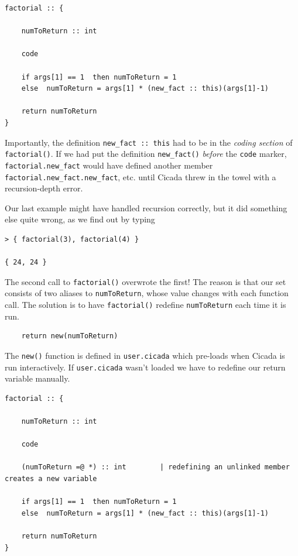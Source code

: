 \documentclass{article}
\newenvironment{code}{
       \begin{list}{}{
               \setlength{\leftmargin}{.4in}
               \setlength{\rightmargin}{0in}
               \setlength{\topsep}{.2in}
       }
       \small
       \item[] }
       { \end{list}   }
\begin{document}
\begin{code} \begin{verbatim}
factorial :: {
    
    numToReturn :: int
    
    code
    
    if args[1] == 1  then numToReturn = 1
    else  numToReturn = args[1] * (new_fact :: this)(args[1]-1)
    
    return numToReturn
}
\end{verbatim} \end{code}

\noindent Importantly, the definition \verb#new_fact :: this# had to be in the \emph{coding section} of \verb#factorial()#.  If we had put the definition \verb#new_fact()# \emph{before} the \verb#code# marker, \verb#factorial.new_fact# would have defined another member \verb#factorial.new_fact.new_fact#, etc. until Cicada threw in the towel with a recursion-depth error.

Our last example might have handled recursion correctly, but it did something else quite wrong, as we find out by typing

\begin{code} \begin{verbatim}
> { factorial(3), factorial(4) }

{ 24, 24 }
\end{verbatim} \end{code}

\noindent The second call to \verb#factorial()# overwrote the first!  The reason is that our set consists of two aliases to \verb#numToReturn#, whose value changes with each function call.  The solution is to have \verb#factorial()# redefine \verb#numToReturn# each time it is run.

\begin{code} \begin{verbatim}
    return new(numToReturn)
\end{verbatim} \end{code}

\noindent The \verb#new()# function is defined in \verb#user.cicada# which pre-loads when Cicada is run interactively.  If \verb#user.cicada# wasn't loaded we have to redefine our return variable manually.

\begin{code} \begin{verbatim}
factorial :: {
    
    numToReturn :: int
    
    code
    
    (numToReturn =@ *) :: int        | redefining an unlinked member creates a new variable
    
    if args[1] == 1  then numToReturn = 1
    else  numToReturn = args[1] * (new_fact :: this)(args[1]-1)
    
    return numToReturn
}
\end{verbatim} \end{code}
\end{document}
